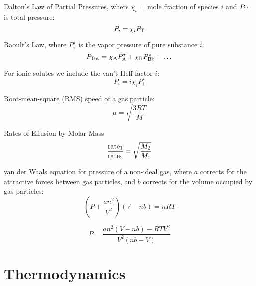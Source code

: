 \documentclass[10pt]{article}
\begin{document}
Dalton's Law of Partial Pressures, where $\chi_i$ = mole fraction of species $i$ and $P_\textnormal{T}$ is total pressure:
\begin{equation*}
P_i=\chi_iP_\textnormal{T}
\end{equation*} 

Raoult's Law, where $P_i^\star$ is the vapor pressure of pure substance $i$:
\begin{equation*}
P_\textnormal{Tot}=\chi_\textnormal{A}P_\textnormal{A}^\star + \chi_\textnormal{B}P_\textnormal{Bb}^\star + \dots
\end{equation*}

For ionic solutes we include the van't Hoff factor $i$:
\begin{equation*}
P_i=i\chi_iP_i^\star
\end{equation*}

Root-mean-square (RMS) speed of a gas particle:
\begin{equation*}
\mu = \sqrt{\frac{3RT}{M}}
\end{equation*}

Rates of Effusion by Molar Mass
\begin{equation*}
\frac{\textnormal{rate}_1}{\textnormal{rate}_2} = \sqrt{\frac{M_2}{M_1}}
\end{equation*}

van der Waals equation for pressure of a non-ideal gas, where $a$ corrects for the attractive forces between gas particles, and $b$ corrects for the volume occupied by gas particles:
\begin{equation*}
\left(P+\frac{an^2}{V^2}\right)(V-nb)=nRT
\end{equation*}

\begin{equation*}
P = \frac{an^2(V-nb)-RTV^2}{V^2(nb-V)}
\end{equation*}


\section{Thermodynamics}

\end{document}
